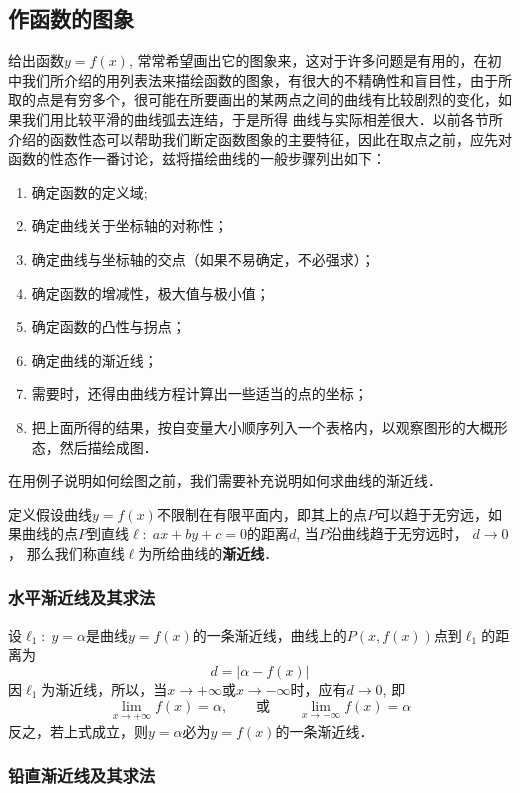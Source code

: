 \subsection{作函数的图象}
给出函数$y=f(x)$, 常常希望画出它的图象来，这对于许多问题是有用的，在初中我们所介绍的用列表法来描绘函数的图象，有很大的不精确性和盲目性，由于所取的点是有穷多个，很可能在所要画出的某两点之间的曲线有比较剧烈的变化，如果我们用比较平滑的曲线弧去连结，于是所得
曲线与实际相差很大．以前各节所介绍的函数性态可以帮助我们断定函数图象的主要特征，因此在取点之前，应先对函数的性态作一番讨论，兹将描绘曲线的一般步骤列出如下：

\begin{enumerate}
\item 确定函数的定义域;
\item 确定曲线关于坐标轴的对称性；
\item 确定曲线与坐标轴的交点（如果不易确定，不必强求）；
\item 确定函数的增减性，极大值与极小值；
\item 确定函数的凸性与拐点；
\item 确定曲线的渐近线；
\item 需要时，还得由曲线方程计算出一些适当的点的坐标；
\item 把上面所得的结果，按自变量大小顺序列入一个表格内，以观察图形的大概形态，然后描绘成图．
\end{enumerate}

在用例子说明如何绘图之前，我们需要补充说明如何求曲线的渐近线．

\begin{blk}
    {定义}假设曲线$y=f(x)$不限制在有限平面内，即其上的点$P$可以趋于无穷远，如果曲线的点$P$到直线$\ell:\; ax+by+c=0$的距离$d$, 当$P$沿曲线趋于无穷远时，
    $d\to 0$，
    那么我们称直线$\ell$为所给曲线的\textbf{渐近线}．
\end{blk}

\subsubsection{水平渐近线及其求法}

设$\ell_1:\; y=\alpha$是曲线$y=f(x)$的一条渐近线，曲线上的$P(x,f(x))$点到$\ell_1$的距离为
\[d=|\alpha-f(x)|\]
因$\ell_1$为渐近线，所以，当$x\to +\infty$或$x\to -\infty$时，应有$d\to 0$, 即
\[\lim_{x\to+\infty}f(x)=\alpha,\qquad \text{或}\qquad \lim_{x\to -\infty}f(x)=\alpha\]
反之，若上式成立，则$y=\alpha$必为$y=f(x)$的一条渐近线．

\subsubsection{铅直渐近线及其求法}

